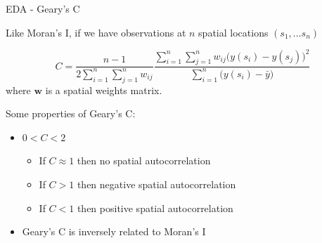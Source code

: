 \documentclass[11pt,ignorenonframetext,]{beamer}
\providecommand{\tightlist}{%
  \setlength{\itemsep}{0pt}\setlength{\parskip}{0pt}}
\begin{document}
\begin{frame}[t]{EDA - Geary's C}

Like Moran's I, if we have observations at \(n\) spatial locations
\((s_1, \ldots s_n)\)

\[ C = \frac{n-1}{2\sum_{i=1}^n \sum_{j=1}^n w_{ij}} \frac{\sum_{i=1}^n \sum_{j=1}^n w_{ij} \big(y(s_i)-y(s_j)\big)^2}{\sum_{i=1}^n \big(y(s_i) - \bar{y}\big)} \]
where \(\bm{w}\) is a spatial weights matrix.

\pause

\vspace{7mm}

Some properties of Geary's C:

\begin{itemize}
\tightlist
\item
  \(0 < C < 2\)

  \begin{itemize}
  \tightlist
  \item
    If \(C \approx 1\) then no spatial autocorrelation
  \item
    If \(C > 1\) then negative spatial autocorrelation
  \item
    If \(C < 1\) then positive spatial autocorrelation
  \end{itemize}
\item
  Geary's C is inversely related to Moran's I
\end{itemize}

\end{frame}
\end{document}
